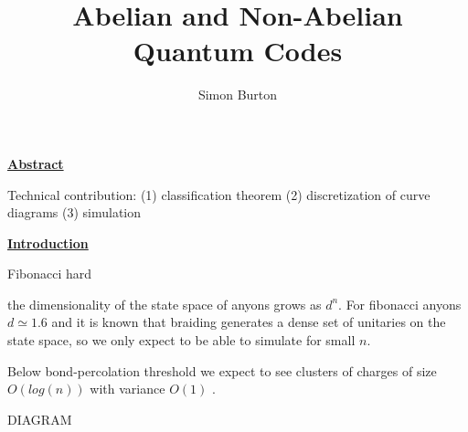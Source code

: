 \documentclass[11pt,a4paper]{article}
\begin{document}
\title{Abelian and Non-Abelian Quantum Codes}

\author{Simon Burton}

\maketitle



\def\Complex {C}
\def\tensor{\otimes}
\def\Tensor{\bigotimes}
\def\bra #1{\langle #1|}
\def\ket #1{|#1\rangle}
\def\braket #1#2{\langle #1|#2 \rangle}



\def\mathZ{\mathbb{Z}}
\def\mathR{\mathbb{R}}


\def\heading #1{\vskip 20pt \noindent\underline{\large \bf #1}\vskip 5pt}

\def\important #1{\underline{\bf #1}}



\heading{Abstract}

Technical contribution: 
(1) classification theorem
(2) discretization of curve diagrams
(3) simulation


\heading{Introduction}

Fibonacci hard


the dimensionality of the state space
of anyons grows as $d^n$.
For fibonacci anyons $d\simeq 1.6$ and
it is known that braiding generates a dense
set of unitaries on the state space, so we
only expect to be able to simulate for small $n.$

Below bond-percolation threshold we expect to see clusters
of charges of size $O(log(n))$ with variance $O(1)$ \cite{Bazant00}.

DIAGRAM

\end{document}
